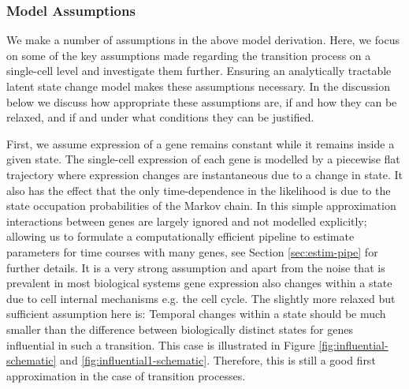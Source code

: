 \subsubsection{Model Assumptions}
\label{sec:model-assumptions}

We make a number of assumptions in the above model derivation. Here, we focus on some of the key assumptions made regarding the transition process on a single-cell level and investigate them further. Ensuring an analytically tractable latent state change model makes these assumptions necessary. In the discussion below we discuss how appropriate these assumptions are, if and how they can be relaxed, and if and under what conditions they can be justified.

First, we assume expression of a gene remains constant while it remains inside a given state. The single-cell expression of each gene is modelled by a piecewise flat trajectory where expression changes are instantaneous due to a change in state. It also has the effect that the only time-dependence in the likelihood is due to the state occupation probabilities of the Markov chain. In this simple approximation interactions between genes are largely ignored and not modelled explicitly; allowing us to formulate a computationally efficient pipeline to estimate parameters for time courses with many genes, see Section \ref{sec:estim-pipe} for further details. It is a very strong assumption and apart from the noise that is prevalent in most biological systems gene expression also changes within a state due to cell internal mechanisms e.g. the cell cycle. The slightly more relaxed but sufficient assumption here is: Temporal changes within a state should be much smaller than the difference between biologically distinct states for genes influential in such a transition. This case is illustrated in Figure \ref{fig:influential-schematic} and \ref{fig:influential1-schematic}. Therefore, this is still a good first approximation in the case of transition processes.

